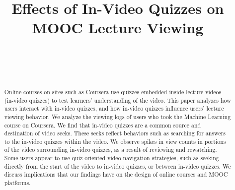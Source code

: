 \documentclass{sigchi}
\begin{document}
\title{Effects of In-Video Quizzes on MOOC Lecture Viewing}

\author{%
  \\
  \\
  \\
}

\maketitle

\begin{abstract}
Online courses on sites such as Coursera use quizzes embedded inside lecture videos (in-video quizzes) to test learners' understanding of the video. This paper analyzes how users interact with in-video quizzes, and how in-video quizzes influence users' lecture viewing behavior. We analyze the viewing logs of users who took the Machine Learning course on Coursera. We find that in-video quizzes are a common source and destination of video seeks. These seeks reflect behaviors such as searching for answers to the in-video quizzes within the video. We observe spikes in view counts in portions of the video surrounding in-video quizzes, as a result of reviewing and rewatching. Some users appear to use quiz-oriented video navigation strategies, such as seeking directly from the start of the video to in-video quizzes, or between in-video quizzes. We discuss implications that our findings have on the design of online courses and MOOC platforms. %
\end{abstract}
\end{document}
